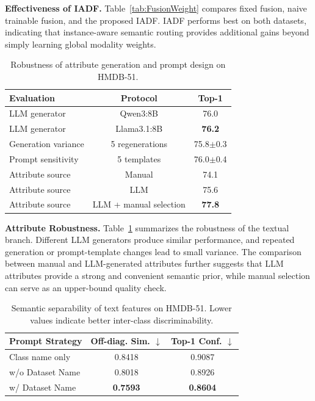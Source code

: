 \documentclass[letterpaper]{article} %
\begin{document}
\noindent\textbf{Effectiveness of IADF.} Table~\ref{tab:FusionWeight} compares fixed fusion, naive trainable fusion, and the proposed IADF. IADF performs best on both datasets, indicating that instance-aware semantic routing provides additional gains beyond simply learning global modality weights.

\begin{table}[tb]
\centering
\caption{Robustness of attribute generation and prompt design on HMDB-51.}
\label{tab:attribute_robustness}
\begin{tabular}{lcc}
\toprule
Evaluation & Protocol & Top-1 \\
\midrule
LLM generator & Qwen3:8B & 76.0 \\
LLM generator & Llama3.1:8B & \textbf{76.2} \\
Generation variance & 5 regenerations & 75.8$\pm$0.3 \\
Prompt sensitivity & 5 templates & 76.0$\pm$0.4 \\
Attribute source & Manual & 74.1 \\
Attribute source & LLM & 75.6 \\
Attribute source & LLM + manual selection & \textbf{77.8} \\
\bottomrule
\end{tabular}
\end{table}

\noindent\textbf{Attribute Robustness.} Table~\ref{tab:attribute_robustness} summarizes the robustness of the textual branch. Different LLM generators produce similar performance, and repeated generation or prompt-template changes lead to small variance. The comparison between manual and LLM-generated attributes further suggests that LLM attributes provide a strong and convenient semantic prior, while manual selection can serve as an upper-bound quality check.

\begin{table}[tb]
\centering
\caption{Semantic separability of text features on HMDB-51. Lower values indicate better inter-class discriminability.}
\label{tab:semantic_sim_main}
\begin{tabular}{lcc}
\toprule
Prompt Strategy & Off-diag. Sim. $\downarrow$ & Top-1 Conf. $\downarrow$ \\
\midrule
Class name only & 0.8418 & 0.9087 \\
w/o Dataset Name & 0.8018 & 0.8926 \\
w/ Dataset Name & \textbf{0.7593} & \textbf{0.8604} \\
\bottomrule
\end{tabular}
\end{table}
\end{document}
